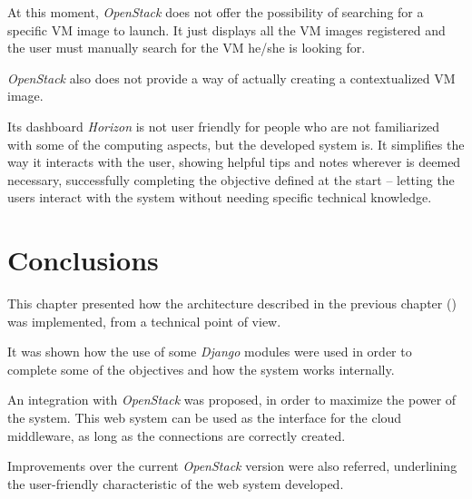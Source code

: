 At this moment, \textit{OpenStack} does not offer the possibility of searching for a specific VM image to launch. It just displays all the VM images registered and the user must manually search for the VM he/she is looking for.

\textit{OpenStack} also does not provide a way of actually creating a contextualized VM image. 

Its dashboard \textit{Horizon} is not user friendly for people who are not familiarized with some of the computing aspects, but the developed system is. It simplifies the way it interacts with the user, showing helpful tips and notes wherever is deemed necessary, successfully completing the objective defined at the start -- letting the users interact with the system without needing specific technical knowledge.


\section{Conclusions}

This chapter presented how the architecture described in the previous chapter () was implemented, from a technical point of view. 

It was shown how the use of some \textit{Django} modules were used in order to complete some of the objectives and how the system works internally.

An integration with \textit{OpenStack} was proposed, in order to maximize the power of the system. This web system can be used as the interface for the cloud middleware, as long as the connections are correctly created.

Improvements over the current \textit{OpenStack} version were also referred, underlining the user-friendly characteristic of the web system developed.
